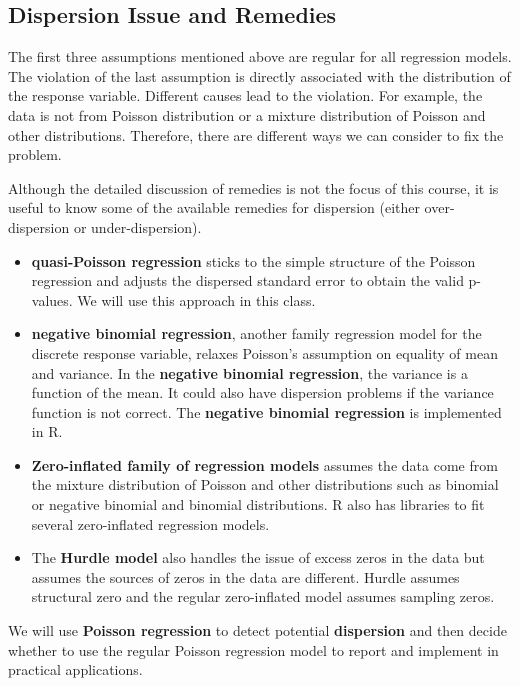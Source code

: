 \documentclass[
]{book}
\begin{document}
\hypertarget{dispersion-issue-and-remedies}{%
\subsection{Dispersion Issue and Remedies}\label{dispersion-issue-and-remedies}}

The first three assumptions mentioned above are regular for all regression models. The violation of the last assumption is directly associated with the distribution of the response variable. Different causes lead to the violation. For example, the data is not from Poisson distribution or a mixture distribution of Poisson and other distributions. Therefore, there are different ways we can consider to fix the problem.

Although the detailed discussion of remedies is not the focus of this course, it is useful to know some of the available remedies for dispersion (either over-dispersion or under-dispersion).

\begin{itemize}
\item
  \textbf{quasi-Poisson regression} sticks to the simple structure of the Poisson regression and adjusts the dispersed standard error to obtain the valid p-values. We will use this approach in this class.
\item
  \textbf{negative binomial regression}, another family regression model for the discrete response variable, relaxes Poisson's assumption on equality of mean and variance. In the \textbf{negative binomial regression}, the variance is a function of the mean. It could also have dispersion problems if the variance function is not correct. The \textbf{negative binomial regression} is implemented in R.
\item
  \textbf{Zero-inflated family of regression models} assumes the data come from the mixture distribution of Poisson and other distributions such as binomial or negative binomial and binomial distributions. R also has libraries to fit several zero-inflated regression models.
\item
  The \textbf{Hurdle model} also handles the issue of excess zeros in the data but assumes the sources of zeros in the data are different. Hurdle assumes structural zero and the regular zero-inflated model assumes sampling zeros.
\end{itemize}

We will use \textbf{Poisson regression} to detect potential \textbf{dispersion} and then decide whether to use the regular Poisson regression model to report and implement in practical applications.
\end{document}
